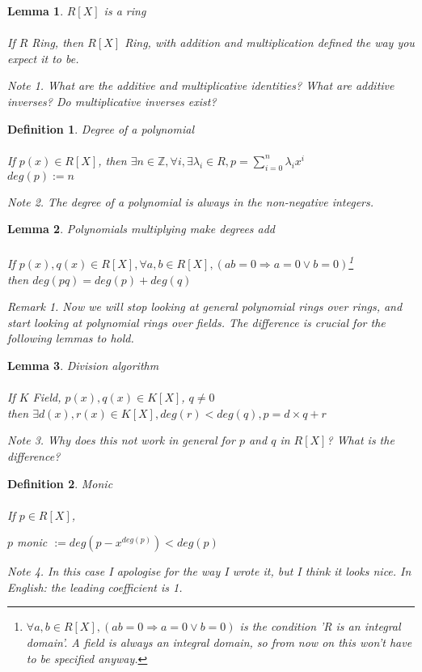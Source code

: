 \documentclass{article}
\theoremstyle{definitionstyle}
\newtheorem{defn}{Definition}[section]
\theoremstyle{lemmastyle}
\newtheorem{lem}{Lemma}[section]
\theoremstyle{remark}
\newtheorem*{note}{Note}
\newtheorem*{remark}{Remark}
\begin{document}
\begin{lem}$R[X]$ is a ring\\
\\
If $R$ Ring, then $R[X]$ Ring, with addition and multiplication defined the way you expect it to be.

\begin{note} What are the additive and multiplicative identities? What are additive inverses? Do multiplicative inverses exist? \end{note}
\end{lem}
\begin{defn} Degree of a polynomial\\
\\
If $p(x) \in R[X]$, then $\exists n \in \mathbb{Z}, \forall i, \exists \lambda_i \in R, p = \sum_{i=0}^{n} \lambda_i x^{i}$\\

$deg(p) := n$
\begin{note} The degree of a polynomial is always in the non-negative integers. \end{note}
\end{defn}
\begin{lem} Polynomials multiplying make degrees add\\
\\
If $p(x), q(x) \in R[X], \forall a, b \in R[X], (ab = 0 \Rightarrow a = 0 \lor b = 0)$\footnote{$\forall a, b \in R[X], (ab = 0 \Rightarrow a = 0 \lor b = 0)$ is the condition 'R is an integral domain'. A field is always an integral domain, so from now on this won't have to be specified anyway.}\\

then $deg(pq) = deg(p) + deg(q)$
\begin{remark} Now we will stop looking at general polynomial rings over rings, and start looking at polynomial rings over fields. The difference is crucial for the following lemmas to hold.\end{remark}\end{lem}

\begin{lem} Division algorithm\\
\\
If $K$ Field, $p(x), q(x) \in K[X]$, $q \ne 0$\\

then $\exists d(x), r(x) \in K[X], deg(r) < deg(q), p = d \times q + r$
\begin{note} Why does this not work in general for $p$ and $q$ in $R[X]$? What is the difference? \end{note}
\end{lem}
\begin{defn} Monic\\
\\
If $p \in R[X]$,

$p$ monic $:= deg(p - x^{deg(p)}) < deg(p)$
\begin{note} In this case I apologise for the way I wrote it, but I think it looks nice. In English: the leading coefficient is 1.\end{note}
\end{defn}
\end{document}
